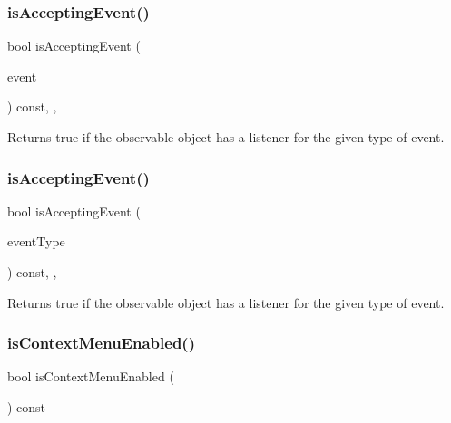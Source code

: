 \subsubsection{\texorpdfstring{is\+Accepting\+Event()}{isAcceptingEvent()}\hspace{0.1cm}{\footnotesize\ttfamily [2/3]}}
{\footnotesize\ttfamily bool is\+Accepting\+Event (\begin{DoxyParamCaption}\item[{const \mbox{\hyperlink{classGEvent}{G\+Event}} \&}]{event }\end{DoxyParamCaption}) const\hspace{0.3cm}{\ttfamily [protected]}, {\ttfamily [virtual]}, {\ttfamily [inherited]}}



Returns true if the observable object has a listener for the given type of event. 

\mbox{\label{classGObservable_a3b1c689267eda44e65a2213e7de38b23}} 
\subsubsection{\texorpdfstring{is\+Accepting\+Event()}{isAcceptingEvent()}\hspace{0.1cm}{\footnotesize\ttfamily [3/3]}}
{\footnotesize\ttfamily bool is\+Accepting\+Event (\begin{DoxyParamCaption}\item[{const std\+::string \&}]{event\+Type }\end{DoxyParamCaption}) const\hspace{0.3cm}{\ttfamily [protected]}, {\ttfamily [virtual]}, {\ttfamily [inherited]}}



Returns true if the observable object has a listener for the given type of event. 

\mbox{\label{classGTextArea_a80f9fe3b6f725182b294886f57cc1689}} 
\subsubsection{\texorpdfstring{is\+Context\+Menu\+Enabled()}{isContextMenuEnabled()}}
{\footnotesize\ttfamily bool is\+Context\+Menu\+Enabled (\begin{DoxyParamCaption}{ }\end{DoxyParamCaption}) const\hspace{0.3cm}{\ttfamily [virtual]}}



